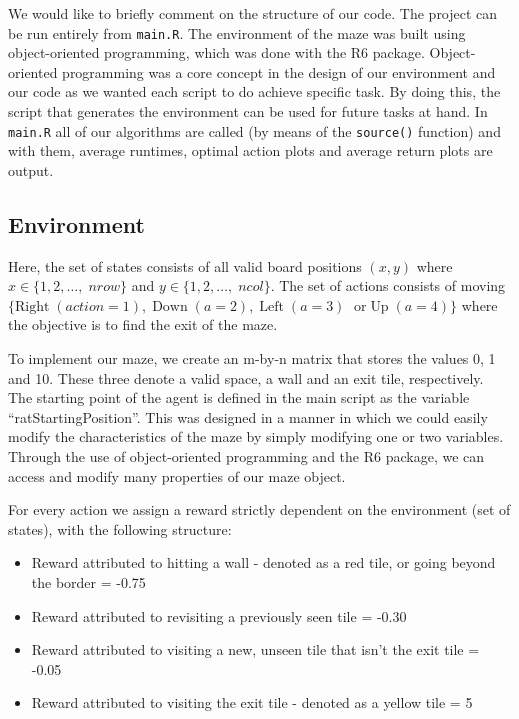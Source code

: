 \documentclass[final,12pt,3p]{elsarticle}
\def\code#1{\texttt{#1}}
\begin{document}
We would like to briefly comment on the structure of our code. The project can be run entirely from \code{main.R}. The environment of the maze was built using object-oriented programming, which was done with the R6 package. Object-oriented programming was a core concept in the design of our environment and our code as we wanted each script to do achieve specific task. By doing this, the script that generates the environment can be used for future tasks at hand. In \code{main.R} all of our algorithms are called (by means of the \code{source()} function) and with them, average runtimes, optimal action plots and average return plots are output. 

\subsection{Environment}
\vspace{12pt}

Here, the set of states consists of all valid board positions $(x,y)$ where $x \in \{1,2,\ldots, \; nrow\}$ and $y \in \{1,2,\ldots, \; ncol\}$. The set of actions consists of moving $\{\text{Right} \; (action = 1), \; \text{Down} \; (a = 2), \; \text{Left} \; (a = 3)$ $ \; \text{or} \; \text{Up} \; (a = 4)\}$ where the objective is to find the exit of the maze.
\par
To implement our maze, we create an m-by-n matrix that stores the values 0, 1 and 10. These three denote a valid space, a wall and an exit tile, respectively. The starting point of the agent is defined in the main script as the variable “ratStartingPosition”. This was designed in a manner in which we could easily modify the characteristics of the maze by simply modifying one or two variables. Through the use of object-oriented programming and the R6 package, we can access and modify many properties of our maze object.

For every action we assign a reward strictly dependent on the environment (set of states), with the following structure:

\begin{itemize}
    \item Reward attributed to hitting a wall - denoted as a red tile, or going beyond the border = -0.75 
    \item Reward attributed to revisiting a previously seen tile = -0.30
    \item Reward attributed to visiting a new, unseen tile that isn't the exit tile = -0.05 
    \item Reward attributed to visiting the exit tile - denoted as a yellow tile = 5 
\end{itemize}
\end{document}
